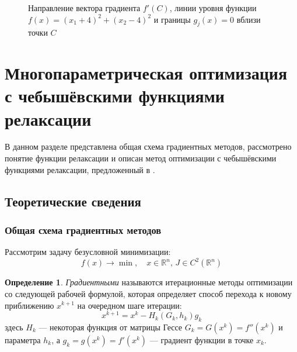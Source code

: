 \documentclass{article}
\providecommand{\neword}{\emph}
\providecommand{\set}[1]{\mathbb{#1}}
\theoremstyle{remark}
\theoremstyle{definition}
\newtheorem{dfn}{Определение}[section]
\numberwithin{equation}{section}
\begin{document}
\begin{itemize}
\begin{figure}[!h]
    \caption{Направление вектора градиента $f'(C)$, линии уровня
      функции $f(x) = (x_1+4)^2+(x_2-4)^2$ и границы $g_j(x)=0$ вблизи
      точки $C$}
    \label{fig:cond-optim-zoom}
  \end{figure}
\end{itemize}
  
\clearpage
\section{Многопараметрическая оптимизация\\
  с чебышёвскими функциями релаксации}
\label{sec:relch}

В данном разделе представлена общая схема градиентных методов,
рассмотрено понятие функции релаксации и описан метод оптимизации с
чебышёвскими функциями релаксации, предложенный в
\cite{chernorutsky04}.

\subsection{Теоретические сведения}

\subsubsection{Общая схема градиентных методов}

Рассмотрим задачу безусловной минимизации:
\begin{equation*}
  f(x) \to \min,\quad x \in \set{R}^n,\, J \in C^2(\set{R}^n)
\end{equation*}

\begin{dfn}
  \neword{Градиентными} называются итерационные методы оптимизации со
  следующей рабочей формулой, которая определяет способ перехода к
  новому приближению $x^{k+1}$ на очередном шаге итерации:
  \begin{equation}
    \label{eq:grad-methods}
    x^{k+1} = x^k - H_k\left(G_k, h_k\right) g_k
  \end{equation}
  здесь $H_k$ — некоторая функция от матрицы Гессе $G_k = G(x^k) =
  f''(x^k)$ и параметра $h_k$, а $g_k = g(x^k) = f'(x^k)$ — градиент
  функции в точке $x_k$.
\end{dfn}
\end{document}
